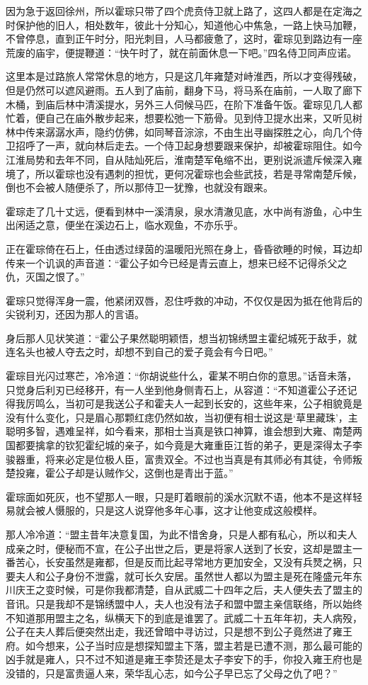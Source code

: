 因为急于返回徐州，所以霍琮只带了四个虎贲侍卫就上路了，这四人都是在定海之时保护他的旧人，相处数年，彼此十分知心，知道他心中焦急，一路上快马加鞭，不曾停息，直到正午时分，阳光刺目，人马都疲惫了，这时，霍琮见到路边有一座荒废的庙宇，便提鞭道：“快午时了，就在前面休息一下吧。”四名侍卫同声应诺。

这里本是过路旅人常常休息的地方，只是这几年雍楚对峙淮西，所以才变得残破，但是仍然可以遮风避雨。五人到了庙前，翻身下马，将马系在庙前，一人取了廊下木桶，到庙后林中清溪提水，另外三人伺候马匹，在阶下准备午饭。霍琮见几人都忙着，便自己在庙外散步起来，想要松弛一下筋骨。见到侍卫提水出来，又听见树林中传来潺潺水声，隐约仿佛，如同琴音淙淙，不由生出寻幽探胜之心，向几个侍卫招呼了一声，就向林后走去。一个侍卫起身想要跟来保护，却被霍琮阻住。如今江淮局势和去年不同，自从陆灿死后，淮南楚军龟缩不出，更别说派遣斥候深入雍境了，所以霍琮也没有遇刺的担忧，更何况霍琮也会些武技，若是寻常南楚斥候，倒也不会被人随便杀了，所以那侍卫一犹豫，也就没有跟来。

霍琮走了几十丈远，便看到林中一溪清泉，泉水清澈见底，水中尚有游鱼，心中生出闲适之意，便坐在溪边石上，临水观鱼，不亦乐乎。

正在霍琮倚在石上，任由透过绿茵的温暖阳光照在身上，昏昏欲睡的时候，耳边却传来一个讥讽的声音道：“霍公子如今已经是青云直上，想来已经不记得杀父之仇，灭国之恨了。”

霍琮只觉得浑身一震，他紧闭双唇，忍住呼救的冲动，不仅仅是因为抵在他背后的尖锐利刃，还因为那人的言语。

身后那人见状笑道：“霍公子果然聪明颖悟，想当初锦绣盟主霍纪城死于敌手，就连名头也被人夺去之时，却想不到自己的爱子竟会有今日吧。”

霍琮目光闪过寒芒，冷冷道：“你胡说些什么，霍某不明白你的意思。”话音未落，只觉身后利刃已经移开，有一人坐到他身侧青石上，从容道：“不知道霍公子还记得我厉鸣么，当初可是我送公子和霍夫人一起到长安的，这些年来，公子相貌竟是没有什么变化，只是眉心那颗红痣仍然如故，当初便有相士说这是‘草里藏珠’，主聪明多智，遇难呈祥，如今看来，那相士当真是铁口神算，谁会想到大雍、南楚两国都要擒拿的钦犯霍纪城的亲子，如今竟是大雍重臣江哲的弟子，更是深得太子李骏器重，将来必定是位极人臣，富贵双全。不过也当真是有其师必有其徒，令师叛楚投雍，霍公子却是认贼作父，这倒也是青出于蓝。”

霍琮面如死灰，也不望那人一眼，只是盯着眼前的溪水沉默不语，他本不是这样轻易就会被人慑服的，只是这人说穿他多年心事，这才让他变成这般模样。

那人冷冷道：“盟主昔年决意复国，为此不惜舍身，只是人都有私心，所以和夫人成亲之时，便秘而不宣，在公子出世之后，更是将家人送到了长安，这却是盟主一番苦心，长安虽然是雍都，但是反而比起寻常地方更加安全，又没有兵燹之祸，只要夫人和公子身份不泄露，就可长久安居。虽然世人都以为盟主是死在隆盛元年东川庆王之变时候，可是你我都清楚，自从武威二十四年之后，夫人便失去了盟主的音讯。只是我却不是锦绣盟中人，夫人也没有法子和盟中盟主亲信联络，所以始终不知道那用盟主之名，纵横天下的到底是谁罢了。武威二十五年年初，夫人病殁，公子在夫人葬后便突然出走，我还曾暗中寻访过，只是想不到公子竟然进了雍王府。如今想来，公子当时应是想探知盟主下落，盟主若是已遭不测，那么最可能的凶手就是雍人，只不过不知道是雍王李贽还是太子李安下的手，你投入雍王府也是没错的，只是富贵逼人来，荣华乱心志，如今公子早已忘了父母之仇了吧？”


